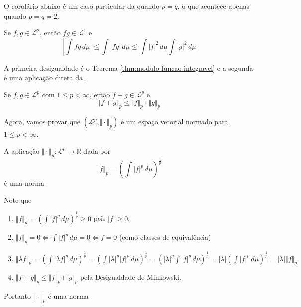 \documentclass[a4paper, 11pt]{book}
\theoremstyle{definition}
\newcommand{\bR}{\mathbb{R}}
\newcommand{\cL}{\mathcal{L}}
\begin{document}
O corolário abaixo é um caso particular da  quando $p = q$, o que acontece apenas quando $p = q = 2$.

\begin{cbox}
    Se $f, g \in \cL^2$, então $fg \in \cL^1$ e
    \[
        \left\vert \int fg \, d\mu \right\vert \leqslant  \int |fg| \, d\mu \leqslant \int |f|^2 \, d\mu \int |g|^2 \, d\mu
    \]
\end{cbox}
\begin{prf}
    A primeira desigualdade é o Teorema \ref{thm:modulo-funcao-integravel} e a segunda é uma aplicação direta da .
\end{prf}

\begin{tbox}
    Se $f, g \in \cL^p$ com $1 \leqslant p < \infty$, então $f + g \in \cL^p$ e
    \[
        \Vert f + g \Vert_p \leqslant \Vert f \Vert_p + \Vert g \Vert_p
    \]
\end{tbox}
\begin{prf}
    
\end{prf}

Agora, vamos provar que $(\cL^p, \Vert \cdot \Vert_p)$ é um espaço vetorial normado para $1 \leqslant p < \infty$.
\begin{pbox}
    A aplicação $\Vert \cdot \Vert_p : \cL^p \to \bR$ dada por
    \[
        \Vert f \Vert_p = \left( \int |f|^p \, d\mu \right)^{\frac{1}{p}}
    \]
    é uma norma
\end{pbox}
\begin{prf}
    Note que
    \begin{enumerate}
        \item $\displaystyle  \Vert f \Vert_p = \left(\int |f|^p \, d\mu \right)^{\frac{1}{p}} \geqslant 0$ pois $|f| \geqslant 0$.
        \item $\displaystyle \Vert f \Vert_p = 0 \iff \int |f|^p \, d\mu = 0 \iff f = 0$ (como classes de equivalência)
        \item $\displaystyle \Vert \lambda f \Vert_p = \left( \int |\lambda f|^p \,d\mu \right)^{\frac{1}{p}} \!\! = \left( \int |\lambda|^p |f|^p \,d\mu \right)^{\frac{1}{p}} \!\! = \left(|\lambda|^p \int |f|^p \,d\mu \right)^{\frac{1}{p}} \!\! = |\lambda| \left( \int |f|^p \,d\mu \right)^{\frac{1}{p}} \!\! = |\lambda| \Vert f \Vert_p$
        \item $\Vert f + g \Vert_p \leqslant \Vert f \Vert_p + \Vert g \Vert_p$ pela Desigualdade de Minkowski.
    \end{enumerate}
    Portanto $\Vert \cdot \Vert_p$ é uma norma
\end{prf}
\end{document}
